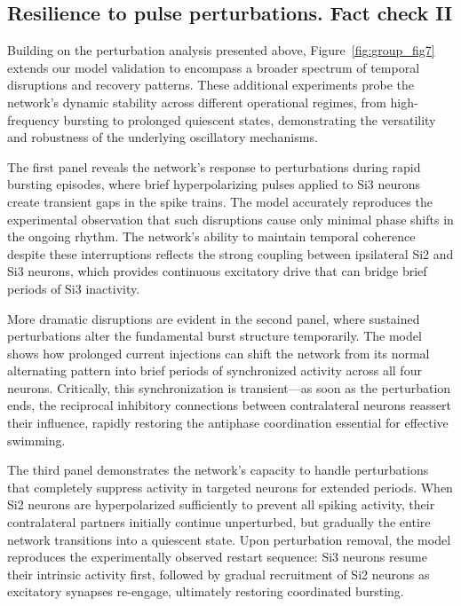 \documentclass[nofootinbib,aip,amsmath,amssymb,reprint,twocolumn,10pt]{revtex4-2}
\begin{document}
\subsection{Resilience to pulse perturbations. Fact check II}

Building on the perturbation analysis presented above, Figure~\ref{fig:group_fig7} extends our model validation to encompass a broader spectrum of temporal disruptions and recovery patterns. These additional experiments probe the network's dynamic stability across different operational regimes, from high-frequency bursting to prolonged quiescent states, demonstrating the versatility and robustness of the underlying oscillatory mechanisms.

The first panel reveals the network's response to perturbations during rapid bursting episodes, where brief hyperpolarizing pulses applied to Si3 neurons create transient gaps in the spike trains. The model accurately reproduces the experimental observation that such disruptions cause only minimal phase shifts in the ongoing rhythm. The network's ability to maintain temporal coherence despite these interruptions reflects the strong coupling between ipsilateral Si2 and Si3 neurons, which provides continuous excitatory drive that can bridge brief periods of Si3 inactivity.

More dramatic disruptions are evident in the second panel, where sustained perturbations alter the fundamental burst structure temporarily. The model shows how prolonged current injections can shift the network from its normal alternating pattern into brief periods of synchronized activity across all four neurons. Critically, this synchronization is transient—as soon as the perturbation ends, the reciprocal inhibitory connections between contralateral neurons reassert their influence, rapidly restoring the antiphase coordination essential for effective swimming.

The third panel demonstrates the network's capacity to handle perturbations that completely suppress activity in targeted neurons for extended periods. When Si2 neurons are hyperpolarized sufficiently to prevent all spiking activity, their contralateral partners initially continue unperturbed, but gradually the entire network transitions into a quiescent state. Upon perturbation removal, the model reproduces the experimentally observed restart sequence: Si3 neurons resume their intrinsic activity first, followed by gradual recruitment of Si2 neurons as excitatory synapses re-engage, ultimately restoring coordinated bursting.
\end{document}
